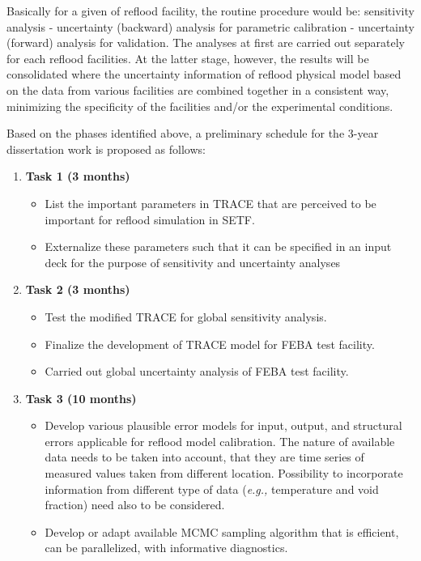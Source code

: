 \documentclass[11pt,titlepage]{article}
\begin{document}
Basically for a given of reflood facility, the routine procedure would be: sensitivity analysis - uncertainty (backward) analysis for parametric calibration - uncertainty (forward) analysis for validation. The analyses at first are carried out separately for each reflood facilities. At the latter stage, however, the results will be consolidated where the uncertainty information of reflood physical model based on the data from various facilities are combined together in a consistent way, minimizing the specificity of the facilities and/or the experimental conditions.

Based on the phases identified above, a preliminary schedule for the 3-year dissertation work is proposed as follows:

\begin{enumerate}
    \item \textbf{Task 1 (3 months)}
        \begin{itemize}
            \item List the important parameters in TRACE that are perceived to be important for reflood simulation in SETF.
            \item Externalize these parameters such that it can be specified in an input deck for the purpose of sensitivity and uncertainty analyses 
        \end{itemize}
    \item \textbf{Task 2 (3 months)}
        \begin{itemize}
            \item Test the modified TRACE for global sensitivity analysis.
            \item Finalize the development of TRACE model for FEBA test facility.
            \item Carried out global uncertainty analysis of FEBA test facility.
        \end{itemize}
   \item \textbf{Task 3 (10 months)}
        \begin{itemize}
            \item Develop various plausible error models for input, output, and structural errors applicable for reflood model calibration. The nature of available data needs to be taken into account, that they are time series of measured values taken from different location. Possibility to incorporate information from different type of data (\textit{e.g.,} temperature and void fraction) need also to be considered.   
            \item Develop or adapt available MCMC sampling algorithm that is efficient, can be parallelized, with informative diagnostics. 

\end{itemize}
\end{enumerate}
\end{document}
